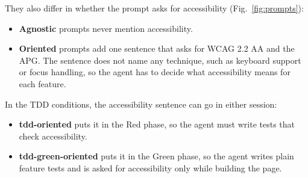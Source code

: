 \documentclass[conference]{IEEEtran}
\begin{document}
They also differ in whether the prompt asks for accessibility (Fig.~\ref{fig:prompts}):
\begin{itemize}
  \item \textbf{Agnostic} prompts never mention accessibility.
  \item \textbf{Oriented} prompts add one sentence that asks for WCAG 2.2 AA and the APG. The sentence does not name any technique, such as keyboard support or focus handling, so the agent has to decide what accessibility means for each feature.
\end{itemize}

In the TDD conditions, the accessibility sentence can go in either session:
\begin{itemize}
  \item \textbf{tdd-oriented} puts it in the Red phase, so the agent must write tests that check accessibility.
  \item \textbf{tdd-green-oriented} puts it in the Green phase, so the agent writes plain feature tests and is asked for accessibility only while building the page.
\end{itemize}
\end{document}
